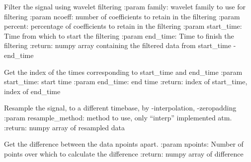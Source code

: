 \documentclass[letterpaper,10pt,english]{sphinxmanual}
\begin{document}
\begin{fulllineitems}
\begin{fulllineitems}
\end{fulllineitems}


\begin{fulllineitems}
\label{signal_base:signal_base.SignalBase.filter_signal}
Filter the signal using wavelet filtering
:param family: wavelet family to use for filtering
:param ncoeff: number of coefficients to retain in the filtering
:param percent: percentage of coefficients to retain in the filtering
:param start\_time: Time from which to start the filtering
:param end\_time: Time to finish the filtering
:return: numpy array containing the filtered data from start\_time - end\_time

\end{fulllineitems}


\begin{fulllineitems}
\label{signal_base:signal_base.SignalBase.get_time_inds}
Get the index of the times corresponding to start\_time and end\_time
:param start\_time: start time
:param end\_time: end time
:return: index of start\_time, index of end\_time

\end{fulllineitems}


\begin{fulllineitems}
\label{signal_base:signal_base.SignalBase.resample_signal}
Resample the signal, to a different timebase,
by
-interpolation,
-zeropadding
:param resample\_method: method to use, only ``interp'' implemented atm.
:return: numpy array of resampled data

\end{fulllineitems}


\begin{fulllineitems}
\label{signal_base:signal_base.SignalBase.get_differences}
Get the difference between the data npoints apart.
:param npoints: Number of points over which to calculate the difference
:return: numpy array of difference


\end{fulllineitems}
\end{fulllineitems}
\end{document}
